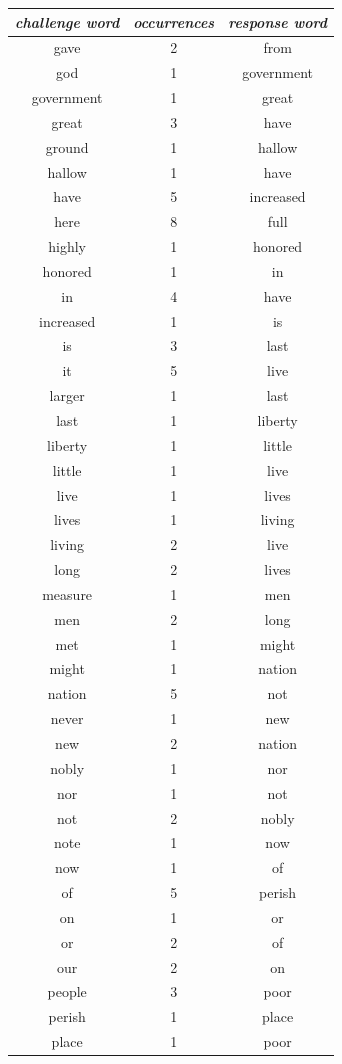 \begin{multicols}{2}
\begin{tabular}{ccc}
\textit{challenge word} & \textit{occurrences} & \textit{response word} \\ \hline
gave & 2 & from \\
god & 1 & government \\
government & 1 & great \\
great & 3 & have \\
ground & 1 & hallow \\
hallow & 1 & have \\
have & 5 & increased \\
here & 8 & full \\
highly & 1 & honored \\
honored & 1 & in \\
in & 4 & have \\
increased & 1 & is \\
is & 3 & last \\
it & 5 & live \\
larger & 1 & last \\
last & 1 & liberty \\
liberty & 1 & little \\
little & 1 & live \\
live & 1 & lives \\
lives & 1 & living \\
living & 2 & live \\
long & 2 & lives \\
measure & 1 & men \\
men & 2 & long \\
met & 1 & might \\
might & 1 & nation \\
nation & 5 & not \\
never & 1 & new \\
new & 2 & nation \\
nobly & 1 & nor \\
nor & 1 & not \\
not & 2 & nobly \\
note & 1 & now \\
now & 1 & of \\
of & 5 & perish \\
on & 1 & or \\
or & 2 & of \\
our & 2 & on \\
people & 3 & poor \\
perish & 1 & place \\
place & 1 & poor \\

\end{tabular}
\end{multicols}
